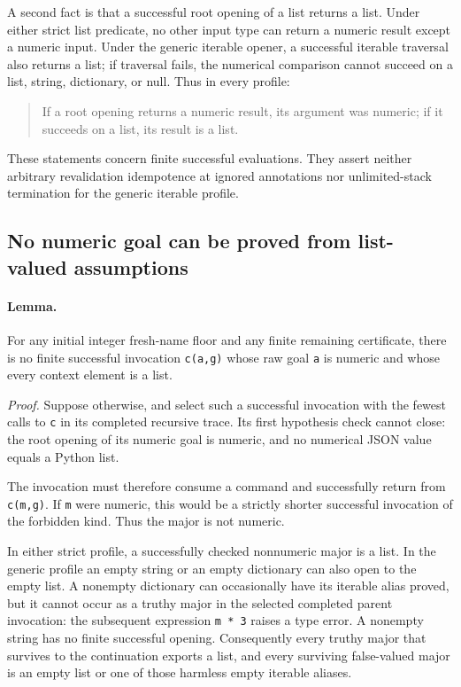 \documentclass[11pt,letterpaper]{article}
\theoremstyle{definition}\newtheorem{definition}[theorem]{Definition}
\theoremstyle{remark}\newtheorem{remark}[theorem]{Remark}
\begin{document}
A second fact is that a successful root opening of a list returns a
list.  Under either strict list predicate, no other input type can
return a numeric result except a numeric input.  Under the generic
iterable opener, a successful iterable traversal also returns a list;
if traversal fails, the numerical comparison cannot succeed on a list,
string, dictionary, or null.  Thus in every profile:
\begin{quote}
If a root opening returns a numeric result, its argument was numeric;
if it succeeds on a list, its result is a list.
\end{quote}
These statements concern finite successful evaluations.  They assert
neither arbitrary revalidation idempotence at ignored annotations nor
unlimited-stack termination for the generic iterable profile.

\subsection{No numeric goal can be proved from list-valued assumptions}

\paragraph{Lemma.}
For any initial integer fresh-name floor and any finite remaining
certificate, there is no finite successful invocation
\texttt{c(a,g)} whose raw goal \texttt{a} is numeric and whose every
context element is a list.

\emph{Proof.}
Suppose otherwise, and select such a successful invocation with the
fewest calls to \texttt{c} in its completed recursive trace.  Its first
hypothesis check cannot close: the root opening of its numeric goal is
numeric, and no numerical JSON value equals a Python list.

The invocation must therefore consume a command and successfully return
from \texttt{c(m,g)}.  If \texttt{m} were numeric, this would be a
strictly shorter successful invocation of the forbidden kind.  Thus the
major is not numeric.

In either strict profile, a successfully checked nonnumeric major is a
list.  In the generic profile an empty string or an empty dictionary can
also open to the empty list.  A nonempty dictionary can occasionally
have its iterable alias proved, but it cannot occur as a truthy major
in the selected completed parent invocation: the subsequent expression
\texttt{m * 3} raises a type error.  A nonempty string has no finite
successful opening.  Consequently every truthy major that survives to
the continuation exports a list, and every surviving false-valued
major is an empty list or one of those harmless empty iterable aliases.
\end{document}

